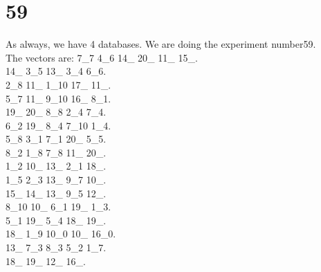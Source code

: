 \chapter{59}
\indent As always, we have 4 databases. We are doing the experiment number59.\\
The vectors are:
7\_7 4\_6 14\_ 20\_ 11\_ 15\_.\\14\_ 3\_5 13\_ 3\_4 6\_6.\\2\_8 11\_ 1\_10 17\_ 11\_.\\5\_7 11\_ 9\_10 16\_ 8\_1.\\19\_ 20\_ 8\_8 2\_4 7\_4.\\6\_2 19\_ 8\_4 7\_10 1\_4.\\5\_8 3\_1 7\_1 20\_ 5\_5.\\8\_2 1\_8 7\_8 11\_ 20\_.\\1\_2 10\_ 13\_ 2\_1 18\_.\\1\_5 2\_3 13\_ 9\_7 10\_.\\15\_ 14\_ 13\_ 9\_5 12\_.\\8\_10 10\_ 6\_1 19\_ 1\_3.\\5\_1 19\_ 5\_4 18\_ 19\_.\\18\_ 1\_9 10\_0 10\_ 16\_0.\\13\_ 7\_3 8\_3 5\_2 1\_7.\\18\_ 19\_ 12\_ 16\_.\\